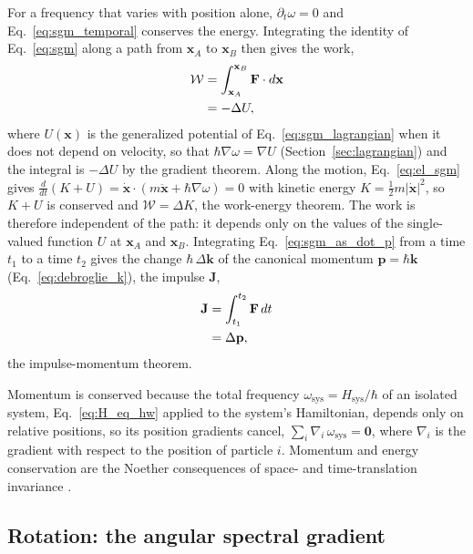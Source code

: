 \documentclass[aps,prd,onecolumn,tightenlines,nofootinbib,notitlepage,11pt,floatfix]{revtex4-2}
\theoremstyle{indentedtheorem}
\begin{document}
For a frequency that varies with position alone, $\partial_t\omega=0$ and Eq.~\eqref{eq:sgm_temporal} conserves the energy. Integrating the identity of Eq.~\eqref{eq:sgm} along a path from $\mathbf{x}_A$ to $\mathbf{x}_B$ then gives the work,
\begin{align}
    \mathcal{W} &= \int_{\mathbf{x}_A}^{\mathbf{x}_B}\mathbf{F}\cdot d\mathbf{x} \notag\\
    &= -\Delta U ,
    \label{eq:work_energy}
\end{align}
where $U(\mathbf{x})$ is the generalized potential of Eq.~\eqref{eq:sgm_lagrangian} when it does not depend on velocity, so that $\hbar\nabla\omega=\nabla U$ (Section~\ref{sec:lagrangian}) and the integral is $-\Delta U$ by the gradient theorem. Along the motion, Eq.~\eqref{eq:el_sgm} gives $\tfrac{d}{dt}(K+U)=\dot{\mathbf{x}}\cdot(m\ddot{\mathbf{x}}+\hbar\nabla\omega)=0$ with kinetic energy $K=\tfrac{1}{2}m|\dot{\mathbf{x}}|^2$, so $K+U$ is conserved and $\mathcal{W}=\Delta K$, the work-energy theorem. The work is therefore independent of the path: it depends only on the values of the single-valued function $U$ at $\mathbf{x}_A$ and $\mathbf{x}_B$. Integrating Eq.~\eqref{eq:sgm_as_dot_p} from a time $t_1$ to a time $t_2$ gives the change $\hbar\,\Delta\mathbf{k}$ of the canonical momentum $\mathbf{p}=\hbar\mathbf{k}$ (Eq.~\eqref{eq:debroglie_k}), the impulse $\mathbf{J}$,
\begin{align}
    \mathbf{J} &= \int_{t_1}^{t_2}\mathbf{F}\,dt \notag\\
    &= \Delta\mathbf{p} ,
    \label{eq:impulse_momentum}
\end{align}
the impulse-momentum theorem.

Momentum is conserved because the total frequency $\omega_\text{sys}=H_\text{sys}/\hbar$ of an isolated system, Eq.~\eqref{eq:H_eq_hw} applied to the system's Hamiltonian, depends only on relative positions, so its position gradients cancel, $\sum_i\nabla_i\,\omega_\text{sys}=\mathbf{0}$, where $\nabla_i$ is the gradient with respect to the position of particle $i$. Momentum and energy conservation are the Noether consequences of space- and time-translation invariance \citep{Noether1918Invariante,Goldstein2002Classical}.

\subsection{Rotation: the angular spectral gradient}
\label{sec:angular}
\end{document}

